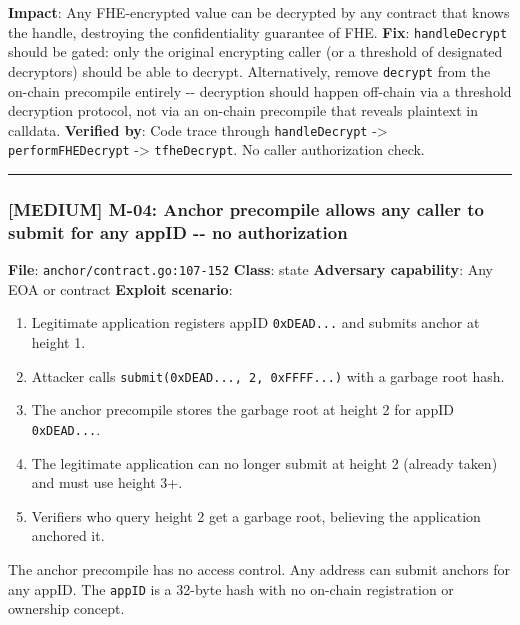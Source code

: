 \documentclass[
]{article}
\providecommand{\tightlist}{%
  \setlength{\itemsep}{0pt}\setlength{\parskip}{0pt}}
\begin{document}
\textbf{Impact}: Any FHE-encrypted value can be decrypted by any
contract that knows the handle, destroying the confidentiality guarantee
of FHE. \textbf{Fix}: \texttt{handleDecrypt} should be gated: only the
original encrypting caller (or a threshold of designated decryptors)
should be able to decrypt. Alternatively, remove \texttt{decrypt} from
the on-chain precompile entirely -\/- decryption should happen off-chain
via a threshold decryption protocol, not via an on-chain precompile that
reveals plaintext in calldata. \textbf{Verified by}: Code trace through
\texttt{handleDecrypt} -\textgreater{} \texttt{performFHEDecrypt}
-\textgreater{} \texttt{tfheDecrypt}. No caller authorization check.

\begin{center}\rule{0.5\linewidth}{0.5pt}\end{center}

\subsubsection{{[}MEDIUM{]} M-04: Anchor precompile allows any caller to
submit for any appID -\/- no
authorization}\label{medium-m-04-anchor-precompile-allows-any-caller-to-submit-for-any-appid----no-authorization}

\textbf{File}: \texttt{anchor/contract.go:107-152} \textbf{Class}: state
\textbf{Adversary capability}: Any EOA or contract \textbf{Exploit
scenario}:

\begin{enumerate}
\def\labelenumi{\arabic{enumi}.}
\tightlist
\item
  Legitimate application registers appID \texttt{0xDEAD...} and submits
  anchor at height 1.
\item
  Attacker calls \texttt{submit(0xDEAD...,\ 2,\ 0xFFFF...)} with a
  garbage root hash.
\item
  The anchor precompile stores the garbage root at height 2 for appID
  \texttt{0xDEAD...}.
\item
  The legitimate application can no longer submit at height 2 (already
  taken) and must use height 3+.
\item
  Verifiers who query height 2 get a garbage root, believing the
  application anchored it.
\end{enumerate}

The anchor precompile has no access control. Any address can submit
anchors for any appID. The \texttt{appID} is a 32-byte hash with no
on-chain registration or ownership concept.
\end{document}
